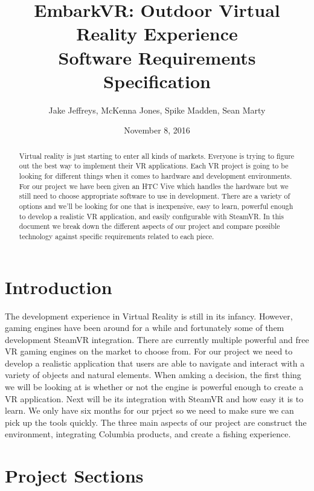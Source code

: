 \documentclass[10pt,journal,compsoc,onecolumn, draftclsnofoot]{IEEEtran}
\title{
EmbarkVR: Outdoor Virtual Reality Experience \\
\vspace{1cm}
Software Requirements Specification \\
\vspace{3cm}
}
\author{Jake Jeffreys, McKenna Jones, Spike Madden, Sean Marty}
\date{November 8, 2016}
\begin{document}
\begin{titlepage}
\vspace{3cm}
\maketitle
\vspace{3cm}
\begin{abstract}
Virtual reality is just starting to enter all kinds of markets. Everyone is trying to figure out the best way to implement their VR applications. Each VR project is going to be looking for different things when it comes to hardware and development environments. For our project we have been given an HTC Vive which handles the hardware but we still need to choose appropriate software to use in development. There are a variety of options and we'll be looking for one that is inexpensive, easy to learn, powerful enough to develop a realistic VR application, and easily configurable with SteamVR. In this document we break down the different aspects of our project and compare possible technology against specific requirements related to each piece.
\end{abstract}

\end{titlepage}

\tableofcontents
\clearpage


\section{Introduction}
The development experience in Virtual Reality is still in its infancy. However, gaming engines have been around for a while and fortunately some of them development SteamVR integration. There are currently multiple powerful and free VR gaming engines on the market to choose from. For our project we need to develop a realistic application that users are able to navigate and interact with a variety of objects and natural elements. When amking a decision, the first thing we will be looking at is whether or not the engine is powerful enough to create a VR application. Next will be its integration with SteamVR and how easy it is to learn. We only have six months for our prject so we need to make sure we can pick up the tools quickly. The three main aspects of our project are construct the environment, integrating Columbia products, and create a fishing experience.

\section{Project Sections}
\end{document}
